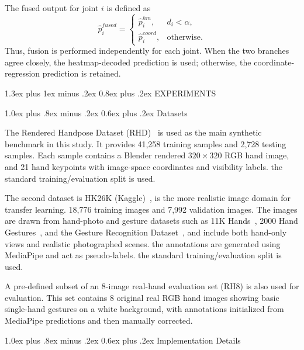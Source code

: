 \documentclass[10pt,letterpaper]{article}
\makeatletter
\renewcommand\section{\@startsection{section}{1}{\z@}%
  {1.3ex plus 1ex minus .2ex}%
  {0.8ex plus .2ex}%
  {\centering\normalfont\small\scshape}}
\renewcommand\subsection{\@startsection{subsection}{2}{\z@}%
  {1.0ex plus .8ex minus .2ex}%
  {0.6ex plus .2ex}%
  {\normalfont\itshape}}
\makeatother
\begin{document}
The fused output for joint \(i\) is defined as
\begin{equation}
\hat{p}^{fused}_i =
\begin{cases}
\hat{p}^{hm}_i, & d_i < \alpha, \\
\hat{p}^{coord}_i, & \text{otherwise.}
\end{cases}
\label{eq:fused-output}
\end{equation}
Thus, fusion is performed independently for each joint. When the two branches agree closely, the heatmap-decoded prediction is used; otherwise, the coordinate-regression prediction is retained.

\section{EXPERIMENTS}

\subsection{Datasets}

The Rendered Handpose Dataset (RHD)~\cite{rhd} is used as the main synthetic benchmark in this study. It provides 41,258 training samples and 2,728 testing samples. Each sample contains a Blender rendered $320 \times 320$ RGB hand image, and 21 hand keypoints with image-space coordinates and visibility labels. the standard training/evaluation split is used.

The second dataset is HK26K (Kaggle)~\cite{hk26k}, is the more realistic image domain for transfer learning. 18,776 training images and 7,992 validation images. The images are drawn from hand-photo and gesture datasets such as 11K Hands~\cite{hands11k}, 2000 Hand Gestures~\cite{giridhar_hand_gestures}, and the Gesture Recognition Dataset~\cite{gesture_recognition_kaggle}, and include both hand-only views and realistic photographed scenes. the annotations are generated using MediaPipe and act as pseudo-labels. the standard training/evaluation split is used.

A pre-defined subset of an 8-image real-hand evaluation set (RH8) is also used for evaluation. This set contains 8 original real RGB hand images showing basic single-hand gestures on a white background, with annotations initialized from MediaPipe predictions and then manually corrected.

\subsection{Implementation Details}
\end{document}
